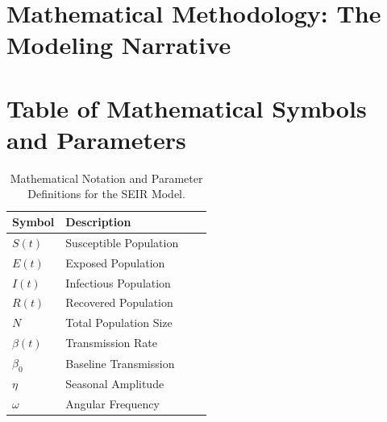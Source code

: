 \documentclass[12pt,a4paper]{report} %
\begin{document}
\section{Mathematical Methodology: The Modeling Narrative}
\section*{Table of Mathematical Symbols and Parameters}

\begin{table}[H]
\centering
\caption{Mathematical Notation and Parameter Definitions for the SEIR Model.}
\label{tab:symbols}
\begin{tabular}{|l|p{6cm}|l|p{4cm}|}
\hline
\textbf{Symbol} & \textbf{Description} \\\hline%
$S(t)$ & Susceptible Population \\\hline%
$E(t)$ & Exposed Population \\\hline%
$I(t)$ & Infectious Population \\\hline%
$R(t)$ & Recovered Population \\\hline%
$N$ & Total Population Size \\\hline%
$\beta(t)$ & Transmission Rate \\\hline%
$\beta_0$ & Baseline Transmission \\\hline%
$\eta$ & Seasonal Amplitude \\\hline%
$\omega$ & Angular Frequency \\\hline%

\end{tabular}
\end{table}
\end{document}
